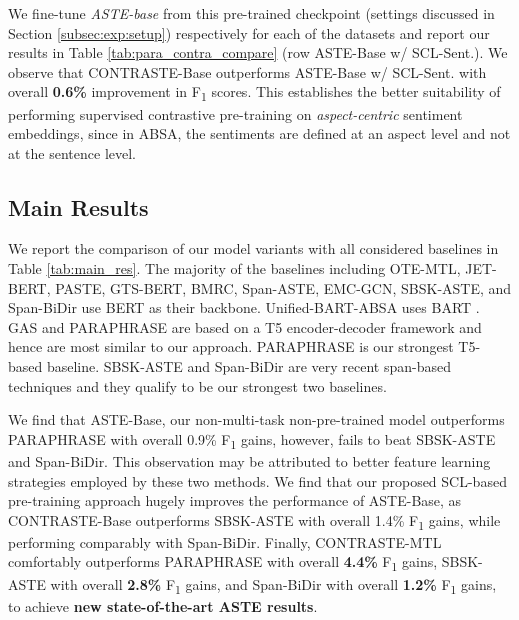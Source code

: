 We fine-tune \textit{ASTE-base} from this pre-trained checkpoint (settings discussed in Section \ref{subsec:exp:setup}) respectively for each of the datasets and report our results in Table \ref{tab:para_contra_compare} (row ASTE-Base w/ SCL-Sent.). 
We observe that CONTRASTE-Base outperforms ASTE-Base w/ SCL-Sent. with overall \textbf{0.6\%} improvement in F\textsubscript{1} scores.
This establishes the better suitability of performing supervised contrastive pre-training on \textit{aspect-centric} sentiment embeddings, since in ABSA, the sentiments are defined at an aspect level and not at the sentence level.



\subsection{Main Results}
\label{subsec:exp:mainres}

We report the comparison of our model variants with all considered baselines in Table \ref{tab:main_res}.
The majority of the baselines including OTE-MTL, JET-BERT, PASTE, GTS-BERT, BMRC, Span-ASTE, EMC-GCN, SBSK-ASTE, and Span-BiDir use BERT \cite{devlin-etal-2019-bert} as their backbone. 
Unified-BART-ABSA uses BART \cite{lewis-etal-2020-bart}.
GAS and PARAPHRASE are based on a T5 encoder-decoder framework and hence are most similar to our approach. 
PARAPHRASE is our strongest T5-based baseline.
SBSK-ASTE and Span-BiDir are very recent span-based techniques and they qualify to be our strongest two baselines.

We find that ASTE-Base, our non-multi-task non-pre-trained model outperforms PARAPHRASE with overall 0.9\% F\textsubscript{1} gains, however, fails to beat SBSK-ASTE and Span-BiDir.
This observation may be attributed to better feature learning strategies employed by these two methods.
We find that our proposed SCL-based pre-training approach hugely improves the performance of ASTE-Base, as CONTRASTE-Base outperforms SBSK-ASTE with overall 1.4\% F\textsubscript{1} gains, while performing comparably with Span-BiDir.
Finally, CONTRASTE-MTL comfortably outperforms PARAPHRASE with overall \textbf{4.4\%} F\textsubscript{1} gains, SBSK-ASTE with overall \textbf{2.8\%} F\textsubscript{1} gains, and Span-BiDir with overall \textbf{1.2\%} F\textsubscript{1} gains, to achieve \textbf{new state-of-the-art ASTE results}.

